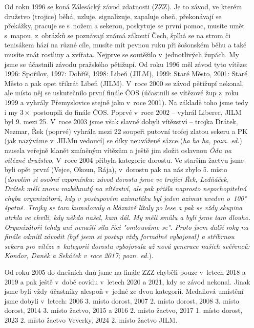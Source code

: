 \documentclass[a5paper, 11pt, twoside]{article}
\begin{document}
\noindent
Od roku 1996 se koná Zálesácký závod zdatnosti (ZZZ). Je to závod, ve
kterém družstvo (trojice) běhá, uzluje, signalizuje, zapaluje oheň,
překonávají se překážky, pracuje se s~nožem a sekerou, poskytuje se
první pomoc, musíte umět s~mapou, z~obrázků se poznávají známá zákoutí
Čech, šplhá se na strom či tenisákem hází na různé cíle, musíte mít
pevnou ruku při šošonském běhu a také musíte znát rostliny a zvířata.
Nejprve se soutěžilo v~jednotlivých župách. My jsme se účastnili závodu
pražského pětižupí. Od roku 1996 měl závod tyto vítěze: 1996: Spořilov,
1997: Dobříš, 1998: Libeň (JILM), 1999: Staré Město, 2001: Staré Město a
pak opet třikrát Libeň (JILM). V~roce 2000 se závod pětižupí nekonal,
ale místo něj se uskutečnilo první finále ČOS (účastnili se vítězové žup
z~roku 1999 a vyhrály Přemyslovice stejně jako v~roce 2001). Na základě
toho jsme tedy i my \(3\times\) postoupili do finále ČOS. Poprvé v~roce 2002 --
vyhrál Liberec, JILM byl 9. mezi 25. V~roce 2003 jsme však slavně dobyli
vítězství -- trojka Drátek, Nezmar, Řek (poprvé) vyhrála mezi 22 soupeři
putovní trofej zlatou sekeru a PK (jak nazýváme v~JILMu vedoucí) se díky
neuvážené sázce (\textit{ha ha ha, pozn. ed.}) musela veřejně klanět
zmíněným vítězům a ještě jim složit oslavnou \textit{Ódu na vítězné
družstvo}. V~roce 2004 přibyla kategorie dorostu. Ve starším žactvu jsme
byli opět první (Vejce, Okoun, Rája), v~dorostu pak na nás zbylo 5.
místo (\textit{dovolím si osobní vzpomínku: závod dorostu jsme ve trojici
Řek, Ledňáček, Drátek měli znovu rozběhnutý na vítězství, ale pak přišla
naprosto nepochopitelná chyba organizátorů, kdy v~postupovém azimuťáku
byl jeden azimut uveden o~100° špatně. Trojky se tam kumulovaly a
bláznivě lítaly po lese a pak se vždy skupina utrhla ve chvíli, kdy
někdo našel, kam dál. My měli smůlu a byli jsme tam dlouho. Organizátoři
tehdy ani nenašli sílu říci "omlouváme se". Proto jsem další roky na
finále odmítl závodit (byť jsem si postup vždy formálně vybojoval) a
stříbrnou sekeru pro vítěze v~kategorii dorostu vybojovala až nová
generace našich svěřenců: Kondor, Daněk a Sekáček v~roce 2017; pozn.
ed.}).

Od roku 2005 do dnešních dnů jsme na finále ZZZ chyběli pouze v~letech
2018 a 2019 a pak ještě v~době covidu v~letech 2020 a 2021, kdy se závod
nekonal. Jinak jsme byli vždy účastníky alespoň v~jedné ze dvou
kategorií. Medailová umístění jsme dobyli v~letech: 2006 3. místo
dorost, 2007 2. místo dorost, 2008 3. místo dorost, 2014 3. místo
žactvo, 2015 a 2016 2. místo žactvo, 2017 1. místo dorost, 2023 2. místo
žactvo Veverky, 2024 2. místo žactvo JILM.
\end{document}
